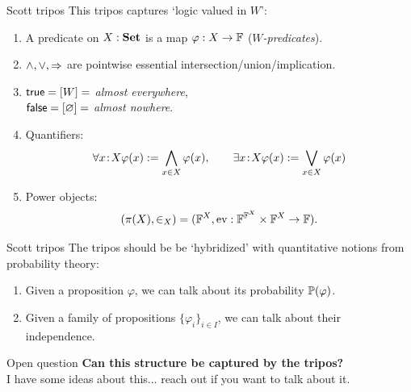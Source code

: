\begin{frame}{Scott tripos}
	This tripos captures `logic valued in $W$':
	\vfill
	\begin{enumerate}
		\item A predicate on $X : \Set$ is a map $\varphi : X \to \alg F$ (\textit{\color{colorgold}$W$-predicates}).
		\item $\land, \lor, \hey$ are pointwise essential intersection/union/implication.
		\item $\true = [W] = $ \textit{\color{colorgold}almost everywhere},\\
		$\false = [\varnothing] =$ \textit{\color{colorgold}almost nowhere}.
		\item Quantifiers:
		\begin{equation*}
			\forall x \tin X \varphi(x) := \bigwedge_{x \in X} \varphi(x), \qquad \exists x \tin X \varphi(x) := \bigvee_{x \in X} \varphi(x)
		\end{equation*}
		\item Power objects:
		\begin{equation*}
			(\pi(X), \in_X) = (\alg F^X, \ev : \alg F^{\alg F^X} \times \alg F^X \to \alg F).
		\end{equation*}
	\end{enumerate}
\end{frame}

\begin{frame}{Scott tripos}
	The tripos should be be `hybridized' with quantitative notions from probability theory:
	\vfill
	\begin{enumerate}
		\item Given a proposition $\varphi$, we can talk about its probability $\P(\varphi)$.
		\item Given a family of propositions $\{\varphi_i\}_{i \in I}$, we can talk about their independence.
	\end{enumerate}
	\vfill
	\begin{block}{Open question}
		\textbf{Can this structure be captured by the tripos?}\\
		I have some ideas about this... reach out if you want to talk about it.
	\end{block}
\end{frame}



